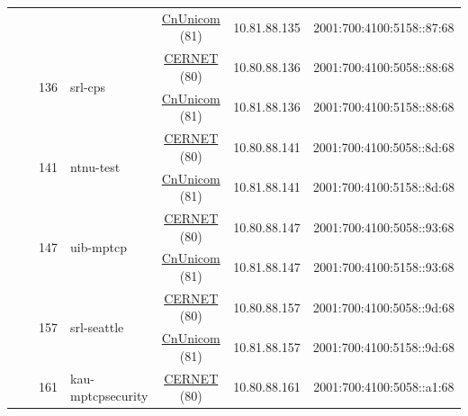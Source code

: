 \begin{small}
\begin{center}
\begin{longtable}{|c|c|c|c|c|c|c|c|}
  &  &  &  & \multicolumn{2}{|c|}{\tiny{\href{http://www.chinaunicom.com}{CnUnicom} (81)}} & \tiny{10.81.88.135} & \tiny{2001:700:4100:5158::87:68} \\* \cline{3-3}\cline{4-4}\cline{5-5}\cline{6-6}\cline{7-7}\cline{8-8}
  &  & \multirow{2}{*}{\tiny{136}} & \multicolumn{1}{|l|}{\multirow{2}{*}{\tiny{srl-cps}}} & \multicolumn{2}{|c|}{\tiny{\href{http://www.cernet.edu.cn}{CERNET} (80)}} & \tiny{10.80.88.136} & \tiny{2001:700:4100:5058::88:68} \\* \cline{5-5}\cline{6-6}\cline{7-7}\cline{8-8}
  &  &  &  & \multicolumn{2}{|c|}{\tiny{\href{http://www.chinaunicom.com}{CnUnicom} (81)}} & \tiny{10.81.88.136} & \tiny{2001:700:4100:5158::88:68} \\* \cline{3-3}\cline{4-4}\cline{5-5}\cline{6-6}\cline{7-7}\cline{8-8}
  &  & \multirow{2}{*}{\tiny{141}} & \multicolumn{1}{|l|}{\multirow{2}{*}{\tiny{ntnu-test}}} & \multicolumn{2}{|c|}{\tiny{\href{http://www.cernet.edu.cn}{CERNET} (80)}} & \tiny{10.80.88.141} & \tiny{2001:700:4100:5058::8d:68} \\* \cline{5-5}\cline{6-6}\cline{7-7}\cline{8-8}
  &  &  &  & \multicolumn{2}{|c|}{\tiny{\href{http://www.chinaunicom.com}{CnUnicom} (81)}} & \tiny{10.81.88.141} & \tiny{2001:700:4100:5158::8d:68} \\* \cline{3-3}\cline{4-4}\cline{5-5}\cline{6-6}\cline{7-7}\cline{8-8}
  &  & \multirow{2}{*}{\tiny{147}} & \multicolumn{1}{|l|}{\multirow{2}{*}{\tiny{uib-mptcp}}} & \multicolumn{2}{|c|}{\tiny{\href{http://www.cernet.edu.cn}{CERNET} (80)}} & \tiny{10.80.88.147} & \tiny{2001:700:4100:5058::93:68} \\* \cline{5-5}\cline{6-6}\cline{7-7}\cline{8-8}
  &  &  &  & \multicolumn{2}{|c|}{\tiny{\href{http://www.chinaunicom.com}{CnUnicom} (81)}} & \tiny{10.81.88.147} & \tiny{2001:700:4100:5158::93:68} \\* \cline{3-3}\cline{4-4}\cline{5-5}\cline{6-6}\cline{7-7}\cline{8-8}
  &  & \multirow{2}{*}{\tiny{157}} & \multicolumn{1}{|l|}{\multirow{2}{*}{\tiny{srl-seattle}}} & \multicolumn{2}{|c|}{\tiny{\href{http://www.cernet.edu.cn}{CERNET} (80)}} & \tiny{10.80.88.157} & \tiny{2001:700:4100:5058::9d:68} \\* \cline{5-5}\cline{6-6}\cline{7-7}\cline{8-8}
  &  &  &  & \multicolumn{2}{|c|}{\tiny{\href{http://www.chinaunicom.com}{CnUnicom} (81)}} & \tiny{10.81.88.157} & \tiny{2001:700:4100:5158::9d:68} \\* \cline{3-3}\cline{4-4}\cline{5-5}\cline{6-6}\cline{7-7}\cline{8-8}
  &  & \multirow{2}{*}{\tiny{161}} & \multicolumn{1}{|l|}{\multirow{2}{*}{\tiny{kau-mptcpsecurity}}} & \multicolumn{2}{|c|}{\tiny{\href{http://www.cernet.edu.cn}{CERNET} (80)}} & \tiny{10.80.88.161} & \tiny{2001:700:4100:5058::a1:68} \\* \cline{5-5}\cline{6-6}\cline{7-7}\cline{8-8}

\end{longtable}
\end{center}
\end{small}
